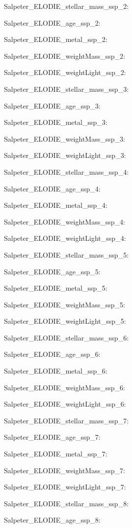 \item Salpeter\_ELODIE\_stellar\_mass\_ssp\_2: 
\item Salpeter\_ELODIE\_age\_ssp\_2: 
\item Salpeter\_ELODIE\_metal\_ssp\_2: 
\item Salpeter\_ELODIE\_weightMass\_ssp\_2: 
\item Salpeter\_ELODIE\_weightLight\_ssp\_2: 
\item Salpeter\_ELODIE\_stellar\_mass\_ssp\_3: 
\item Salpeter\_ELODIE\_age\_ssp\_3: 
\item Salpeter\_ELODIE\_metal\_ssp\_3: 
\item Salpeter\_ELODIE\_weightMass\_ssp\_3: 
\item Salpeter\_ELODIE\_weightLight\_ssp\_3: 
\item Salpeter\_ELODIE\_stellar\_mass\_ssp\_4: 
\item Salpeter\_ELODIE\_age\_ssp\_4: 
\item Salpeter\_ELODIE\_metal\_ssp\_4: 
\item Salpeter\_ELODIE\_weightMass\_ssp\_4: 
\item Salpeter\_ELODIE\_weightLight\_ssp\_4: 
\item Salpeter\_ELODIE\_stellar\_mass\_ssp\_5: 
\item Salpeter\_ELODIE\_age\_ssp\_5: 
\item Salpeter\_ELODIE\_metal\_ssp\_5: 
\item Salpeter\_ELODIE\_weightMass\_ssp\_5: 
\item Salpeter\_ELODIE\_weightLight\_ssp\_5: 
\item Salpeter\_ELODIE\_stellar\_mass\_ssp\_6: 
\item Salpeter\_ELODIE\_age\_ssp\_6: 
\item Salpeter\_ELODIE\_metal\_ssp\_6: 
\item Salpeter\_ELODIE\_weightMass\_ssp\_6: 
\item Salpeter\_ELODIE\_weightLight\_ssp\_6: 
\item Salpeter\_ELODIE\_stellar\_mass\_ssp\_7: 
\item Salpeter\_ELODIE\_age\_ssp\_7: 
\item Salpeter\_ELODIE\_metal\_ssp\_7: 
\item Salpeter\_ELODIE\_weightMass\_ssp\_7: 
\item Salpeter\_ELODIE\_weightLight\_ssp\_7: 
\item Salpeter\_ELODIE\_stellar\_mass\_ssp\_8: 
\item Salpeter\_ELODIE\_age\_ssp\_8: 
